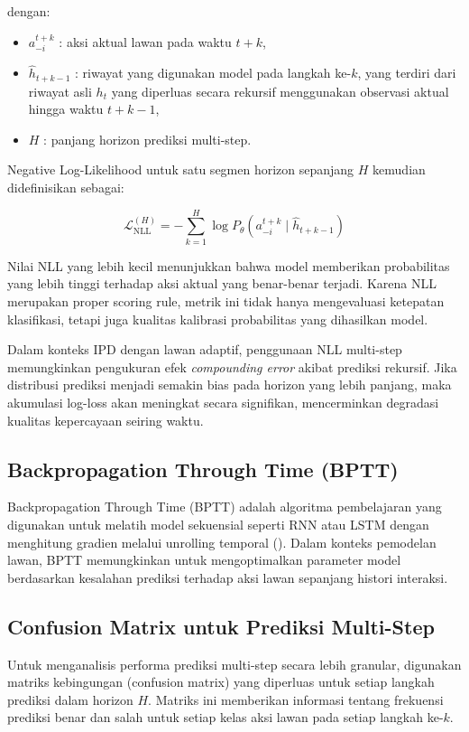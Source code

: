 dengan:

\begin{itemize}
\item $a_{-i}^{t+k}$ : aksi aktual lawan pada waktu $t+k$,
\item $\hat{h}_{t+k-1}$ : riwayat yang digunakan model pada langkah ke-$k$, 
yang terdiri dari riwayat asli $h_t$ yang diperluas secara rekursif menggunakan observasi aktual hingga waktu $t+k-1$,
\item $H$ : panjang horizon prediksi multi-step.
\end{itemize}

Negative Log-Likelihood untuk satu segmen horizon sepanjang $H$ kemudian didefinisikan sebagai:

\begin{equation}
\mathcal{L}_{\text{NLL}}^{(H)} 
= - \sum_{k=1}^{H} 
\log P_\theta(a_{-i}^{t+k} \mid \hat{h}_{t+k-1})
\end{equation}

Nilai NLL yang lebih kecil menunjukkan bahwa model memberikan probabilitas yang lebih tinggi terhadap aksi aktual yang benar-benar terjadi. Karena NLL merupakan proper scoring rule, metrik ini tidak hanya mengevaluasi ketepatan klasifikasi, tetapi juga kualitas kalibrasi probabilitas yang dihasilkan model.

Dalam konteks IPD dengan lawan adaptif, penggunaan NLL multi-step memungkinkan pengukuran efek \textit{compounding error} akibat prediksi rekursif. Jika distribusi prediksi menjadi semakin bias pada horizon yang lebih panjang, maka akumulasi log-loss akan meningkat secara signifikan, mencerminkan degradasi kualitas kepercayaan seiring waktu.

\subsection{Backpropagation Through Time (BPTT)}\label{sec:BPTT}
Backpropagation Through Time (BPTT) adalah algoritma pembelajaran yang digunakan untuk melatih model sekuensial seperti RNN atau LSTM dengan menghitung gradien melalui unrolling temporal (\cite{werbos_backpropagation_1990}). Dalam konteks pemodelan lawan, BPTT memungkinkan untuk mengoptimalkan parameter model berdasarkan kesalahan prediksi terhadap aksi lawan sepanjang histori interaksi.

\subsection{Confusion Matrix untuk Prediksi Multi-Step}
Untuk menganalisis performa prediksi multi-step secara lebih granular, digunakan matriks kebingungan (confusion matrix) yang diperluas untuk setiap langkah prediksi dalam horizon $H$. Matriks ini memberikan informasi tentang frekuensi prediksi benar dan salah untuk setiap kelas aksi lawan pada setiap langkah ke-$k$.

